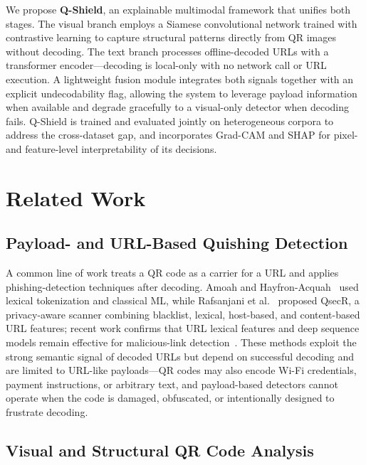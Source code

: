 \documentclass[conference]{IEEEtran}
\begin{document}
We propose \textbf{Q-Shield}, an explainable multimodal framework that unifies both stages. The visual branch employs a Siamese convolutional network trained with contrastive learning to capture structural patterns directly from QR images without decoding. The text branch processes offline-decoded URLs with a transformer encoder---decoding is local-only with no network call or URL execution. A lightweight fusion module integrates both signals together with an explicit undecodability flag, allowing the system to leverage payload information when available and degrade gracefully to a visual-only detector when decoding fails. Q-Shield is trained and evaluated jointly on heterogeneous corpora to address the cross-dataset gap, and incorporates Grad-CAM and SHAP for pixel- and feature-level interpretability of its decisions.
\section{Related Work}
\label{sec:related}

\subsection{Payload- and URL-Based Quishing Detection}

A common line of work treats a QR code as a carrier for a URL and applies phishing-detection techniques after decoding. Amoah and Hayfron-Acquah~\cite{amoah2022qr} used lexical tokenization and classical ML, while Rafsanjani et al.~\cite{rafsanjani2023qsecr} proposed QsecR, a privacy-aware scanner combining blacklist, lexical, host-based, and content-based URL features; recent work confirms that URL lexical features and deep sequence models remain effective for malicious-link detection~\cite{jayaprakash2024heuristic}. These methods exploit the strong semantic signal of decoded URLs but depend on successful decoding and are limited to URL-like payloads---QR codes may also encode Wi-Fi credentials, payment instructions, or arbitrary text, and payload-based detectors cannot operate when the code is damaged, obfuscated, or intentionally designed to frustrate decoding.

\subsection{Visual and Structural QR Code Analysis}
\end{document}
